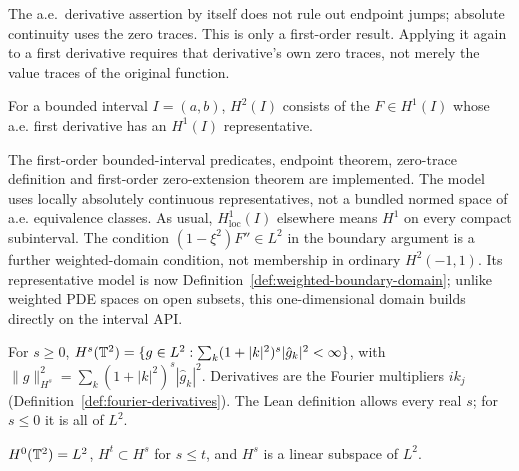 \begin{remark}
The a.e.\ derivative assertion by itself does not rule out endpoint jumps;
absolute continuity uses the zero traces. This is only a first-order result.
Applying it again to a first derivative requires that derivative's own zero
traces, not merely the value traces of the original function.
\end{remark}

\begin{definition}[$H^2$ on an interval]
\label{def:h2-interval}
\leanok
For a bounded interval $I=(a,b)$, $H^2(I)$ consists of the $F\in H^1(I)$
whose a.e. first derivative has an $H^1(I)$ representative.
\end{definition}

\begin{remark}
The first-order bounded-interval predicates, endpoint theorem, zero-trace
definition and first-order zero-extension theorem are implemented. The model uses locally absolutely continuous
representatives, not a bundled normed space of a.e. equivalence classes.
As usual, $H^1_{\mathrm{loc}}(I)$ elsewhere means $H^1$ on every compact
subinterval. The condition
$(1-\xi^2)F''\in L^2$ in the boundary argument is a further weighted-domain
condition, not membership in ordinary $H^2(-1,1)$. Its representative model
is now Definition~\ref{def:weighted-boundary-domain}; unlike weighted PDE
spaces on open subsets, this one-dimensional domain builds directly on the
interval API.
\end{remark}

\begin{definition}
\label{def:sobolev-torus}
\leanok
For $s\ge0$, $H^s(\mathbb{T}^2)=\{g\in L^2:\sum_k(1+|k|^2)^s|\hat g_k|^2<\infty\}$,
with $\|g\|_{H^s}^2=\sum_k(1+|k|^2)^s|\hat g_k|^2$.
Derivatives are the Fourier multipliers $ik_j$
(Definition~\ref{def:fourier-derivatives}). The Lean definition allows every
real $s$; for $s\le0$ it is all of $L^2$.
\end{definition}

\begin{lemma}
\label{lem:sobolev-torus-basic}
\leanok
$H^0(\mathbb{T}^2)=L^2$, $H^t\subset H^s$ for $s\le t$, and $H^s$ is a linear subspace
of $L^2$.
\end{lemma}

